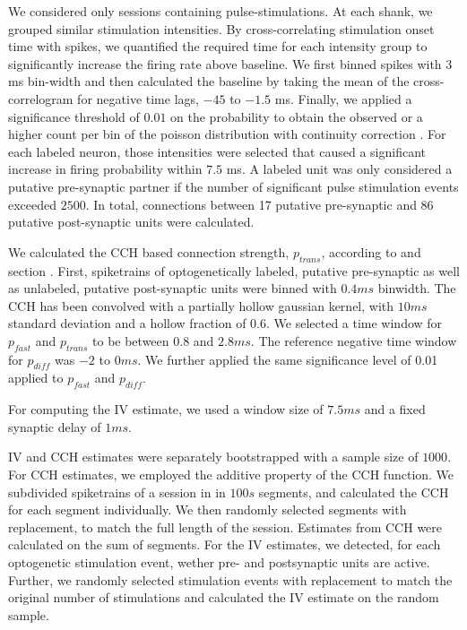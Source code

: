 \documentclass[11pt]{article}
\begin{document}
We considered only sessions containing pulse-stimulations.
At each shank, we grouped similar stimulation intensities.
By cross-correlating stimulation onset time with spikes, we quantified the required time for each intensity group to significantly increase the firing rate above baseline.
We first binned spikes with $3$ ms bin-width and then calculated the baseline by taking the mean of the cross-correlogram for negative time lags, $-45$ to $-1.5$ ms.
Finally, we applied a significance threshold of $0.01$ on the probability to obtain the observed or a higher count per bin of the poisson distribution with continuity correction \citep{abeles1982quantification}.
For each labeled neuron, those intensities were selected that caused a significant increase in firing probability within $7.5$ ms.
A labeled unit was only considered a putative pre-synaptic partner if the number of significant pulse stimulation events exceeded $2500$.
In total, connections between 17 putative pre-synaptic and 86 putative post-synaptic units were calculated.

We calculated the CCH based connection strength, $p_{trans}$, according to \citep{English2017} and section .
First, spiketrains of optogenetically labeled, putative pre-synaptic as well as unlabeled, putative post-synaptic units were binned with $0.4 ms$ binwidth.
The CCH has been convolved with a partially hollow gaussian kernel, with $10 ms$ standard deviation and a hollow fraction of $0.6$.
We selected a time window for $p_{fast}$ and $p_{trans}$ to be between $0.8$ and $2.8 ms$.
The reference negative time window for $p_{diff}$ was $-2$ to $0 ms$.
We further applied the same significance level of 0.01 applied to $p_{fast}$ and $p_{diff}$.

For computing the IV estimate, we used a window size of $7.5 ms$ and a fixed synaptic delay of $1 ms$.

IV and CCH estimates were separately bootstrapped with a sample size of $1000$.
For CCH estimates, we employed the additive property of the CCH function.
We subdivided spiketrains of a session in in $100 s$ segments, and calculated the CCH for each segment individually.
We then randomly selected segments with replacement, to match the full length of the session.
Estimates from CCH were calculated on the sum of segments.
For the IV estimates, we detected, for each optogenetic stimulation event, wether pre- and postsynaptic units are active.
Further, we randomly selected stimulation events with replacement to match the original number of stimulations and calculated the IV estimate on the random sample.
\end{document}
